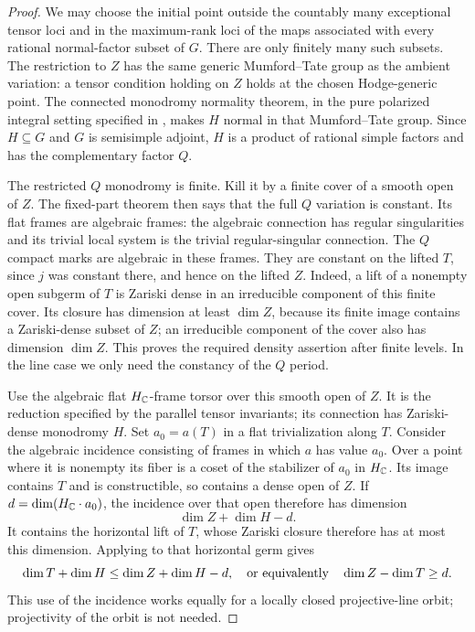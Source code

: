 \begin{proof}
We may choose the initial point outside the countably many exceptional
tensor loci and in the maximum-rank loci of the maps associated with
every rational normal-factor subset of $G$.  There are only finitely
many such subsets.  The restriction to $Z$ has the same generic
Mumford--Tate group as the ambient variation: a tensor condition
holding on $Z$ holds at the chosen Hodge-generic point.  The connected
monodromy normality theorem, in the pure polarized integral setting
specified in , makes $H$ normal in that
Mumford--Tate group.  Since $H\subseteq G$ and $G$ is semisimple
adjoint, $H$ is a product of rational simple factors and has the
complementary factor $Q$.

The restricted $Q$ monodromy is finite.  Kill it by a finite cover of
a smooth open of $Z$.  The fixed-part theorem then says that the full
$Q$ variation is constant.  Its flat frames are algebraic frames:
the algebraic connection has regular singularities and its trivial
local system is the trivial regular-singular connection.  The
$Q$ compact marks are algebraic in these frames.  They are constant
on the lifted $T$, since $j$ was constant there, and hence on the
lifted $Z$.  Indeed, a lift of a nonempty open subgerm of $T$ is
Zariski dense in an irreducible component of this finite cover.  Its
closure has dimension at least $\dim Z$, because its finite image
contains a Zariski-dense subset of $Z$; an irreducible component of
the cover also has dimension $\dim Z$.  This proves the required
density assertion after finite levels.  In the line case we only
need the constancy of the $Q$ period.

Use the algebraic flat $H_{\mathbb C}$-frame torsor over this smooth open of
$Z$.  It is the reduction specified by the parallel tensor
invariants; its connection has Zariski-dense monodromy $H$.  Set
$a_0=a(T)$ in a flat trivialization along $T$.  Consider the
algebraic incidence consisting of frames in which $a$ has value
$a_0$.  Over a point where it is nonempty its fiber is a coset of
the stabilizer of $a_0$ in $H_{\mathbb C}$.  Its image contains $T$ and is
constructible, so contains a dense open of $Z$.  If
$d=\dim(H_{\mathbb C}\cdot a_0)$, the incidence over that open therefore
has dimension
\[
                  \dim Z+\dim H-d.
\]
It contains the horizontal lift of $T$, whose Zariski closure therefore
has at most this dimension.  Applying
 to that horizontal germ gives
\[
 \dim T+\dim H\leq\dim Z+\dim H-d,
 \quad\hbox{or equivalently}\quad
 \dim Z-\dim T\geq d.
\]
This use of the incidence works equally for a locally closed
projective-line orbit; projectivity of the orbit is not needed.


\end{proof}
